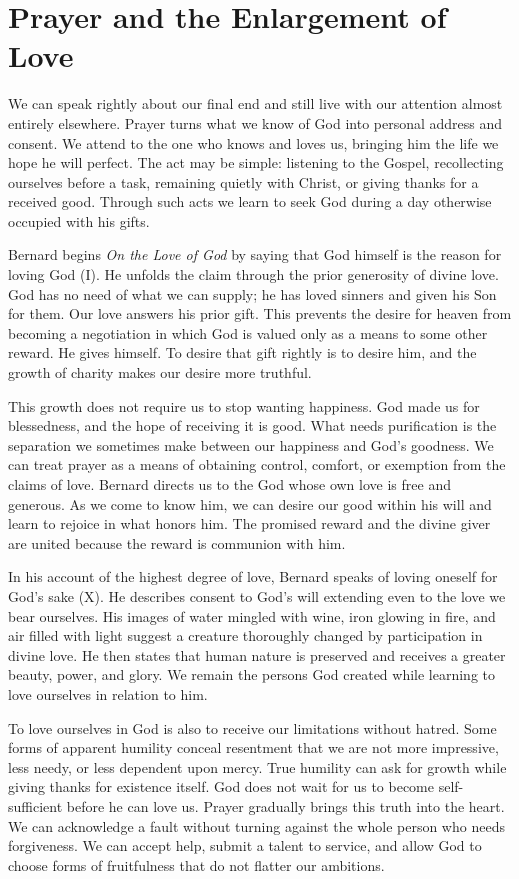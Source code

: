 \section{Prayer and the Enlargement of Love}

We can speak rightly about our final end and still live with our attention almost entirely elsewhere. Prayer turns what we know of God into personal address and consent. We attend to the one who knows and loves us, bringing him the life we hope he will perfect. The act may be simple: listening to the Gospel, recollecting ourselves before a task, remaining quietly with Christ, or giving thanks for a received good. Through such acts we learn to seek God during a day otherwise occupied with his gifts.

Bernard begins \emph{On the Love of God} by saying that God himself is the reason for loving God (I). He unfolds the claim through the prior generosity of divine love. God has no need of what we can supply; he has loved sinners and given his Son for them. Our love answers his prior gift. This prevents the desire for heaven from becoming a negotiation in which God is valued only as a means to some other reward. He gives himself. To desire that gift rightly is to desire him, and the growth of charity makes our desire more truthful.

This growth does not require us to stop wanting happiness. God made us for blessedness, and the hope of receiving it is good. What needs purification is the separation we sometimes make between our happiness and God's goodness. We can treat prayer as a means of obtaining control, comfort, or exemption from the claims of love. Bernard directs us to the God whose own love is free and generous. As we come to know him, we can desire our good within his will and learn to rejoice in what honors him. The promised reward and the divine giver are united because the reward is communion with him.

In his account of the highest degree of love, Bernard speaks of loving oneself for God's sake (X). He describes consent to God's will extending even to the love we bear ourselves. His images of water mingled with wine, iron glowing in fire, and air filled with light suggest a creature thoroughly changed by participation in divine love. He then states that human nature is preserved and receives a greater beauty, power, and glory. We remain the persons God created while learning to love ourselves in relation to him.

To love ourselves in God is also to receive our limitations without hatred. Some forms of apparent humility conceal resentment that we are not more impressive, less needy, or less dependent upon mercy. True humility can ask for growth while giving thanks for existence itself. God does not wait for us to become self-sufficient before he can love us. Prayer gradually brings this truth into the heart. We can acknowledge a fault without turning against the whole person who needs forgiveness. We can accept help, submit a talent to service, and allow God to choose forms of fruitfulness that do not flatter our ambitions.

